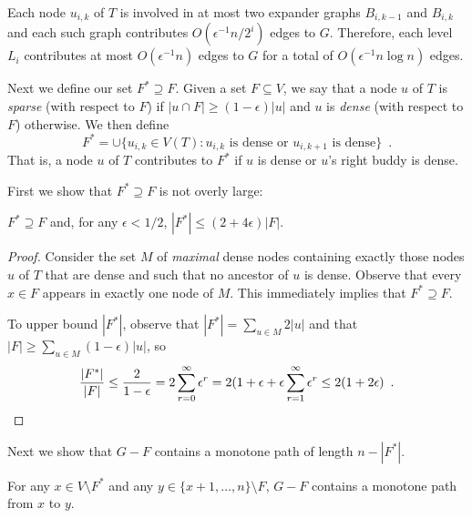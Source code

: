 \documentclass{patmorin}
\begin{document}
Each node $u_{i,k}$ of $T$ is involved in at most two expander
graphs $B_{i,k-1}$ and $B_{i,k}$ and each such graph contributes
$O(\epsilon^{-1}n/2^{i})$ edges to $G$.  Therefore, each level $L_i$
contributes at most $O(\epsilon^{-1} n)$ edges to $G$ for a total of
$O(\epsilon^{-1}n\log n)$ edges.  

Next we define our set $F^*\supseteq F$.  Given a set $F\subseteq V$,
we say that a node $u$ of $T$ is \emph{sparse} (with respect to $F$)
if $|u\cap F| \ge (1-\epsilon)|u|$ and $u$ is \emph{dense} (with respect
to $F$) otherwise.  We then define
\[
	F^* = \cup\{ u_{i,k}\in V(T): \text{$u_{i,k}$ is dense or $u_{i,k+1}$ is dense} \} \enspace .
\]
That is, a node $u$ of $T$ contributes to $F^*$ if $u$ is dense or $u$'s
right buddy is dense.

First we show that $F^*\supseteq F$ is not overly large:

\begin{clm}
  $F^*\supseteq F$ and, for any $\epsilon < 1/2$, $|F^*|\le (2+4\epsilon)|F|$.
\end{clm}

\begin{proof}
  Consider the set $M$ of \emph{maximal} dense nodes containing exactly
  those nodes $u$ of $T$ that are dense and such that no ancestor of $u$
  is dense.  Observe that every $x\in F$ appears in exactly one node
  of $M$.  This immediately implies that $F^*\supseteq F$.

  To upper bound $|F^*|$, observe that $|F^*| = \sum_{u\in M} 2|u|$
  and that 
	$|F| \ge \sum_{u\in M} (1-\epsilon)|u|$, 
	so
  \[
    \frac{|F^*|}{|F|} 
      \le \frac{2}{1-\epsilon} 
	= 2\sum_{r=0}^\infty\epsilon^r 
	= 2(1+\epsilon + \epsilon\sum_{r=1}^\infty \epsilon^r 
	\le 2(1+2\epsilon) \enspace . \qedhere
	  \]
\end{proof}

Next we show that $G-F$ contains a monotone path of length $n-|F^*|$.

\begin{clm}
  For any $x\in V\setminus F^*$ and any $y\in \{x+1,\ldots,n\}\setminus
  F$, $G-F$ contains a monotone path from $x$ to $y$.
\end{clm}
\end{document}
